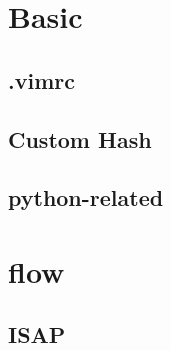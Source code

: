 \documentclass[a4paper,10pt,twocolumn,oneside]{article}
\begin{document}
\pagestyle{fancy}
\fancyfoot{}
\fancyhead[R]{\thepage}
\renewcommand{\headrulewidth}{0.4pt}
\renewcommand{\contentsname}{Contents} 

\scriptsize
\tableofcontents


\section{Basic}
\subsection{.vimrc}


%

%

%

\subsection{Custom Hash}


\subsection{python-related}


\section{flow}

\subsection{ISAP}

\end{document}
